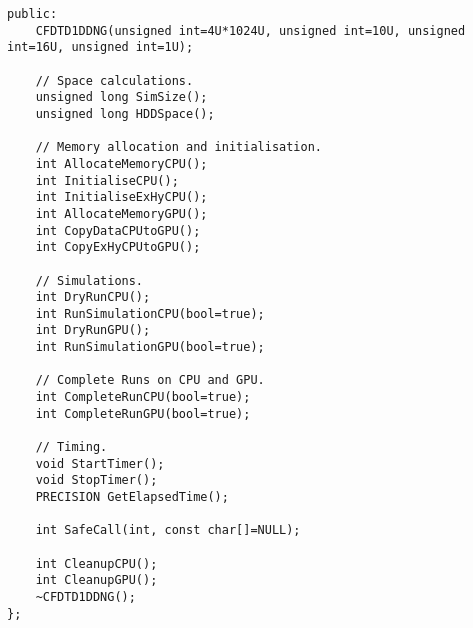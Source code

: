 \begin{lstlisting}
public:
	CFDTD1DDNG(unsigned int=4U*1024U, unsigned int=10U, unsigned int=16U, unsigned int=1U);

	// Space calculations.
	unsigned long SimSize();
	unsigned long HDDSpace();

	// Memory allocation and initialisation.
	int AllocateMemoryCPU();
	int InitialiseCPU();
	int InitialiseExHyCPU();
	int AllocateMemoryGPU();
	int CopyDataCPUtoGPU();
	int CopyExHyCPUtoGPU();

	// Simulations.
	int DryRunCPU();
	int RunSimulationCPU(bool=true);
	int DryRunGPU();
	int RunSimulationGPU(bool=true);

	// Complete Runs on CPU and GPU.
	int CompleteRunCPU(bool=true);
	int CompleteRunGPU(bool=true);

	// Timing.
	void StartTimer();
	void StopTimer();
	PRECISION GetElapsedTime();

	int SafeCall(int, const char[]=NULL);

	int CleanupCPU();
	int CleanupGPU();
	~CFDTD1DDNG();
};
\end{lstlisting}
